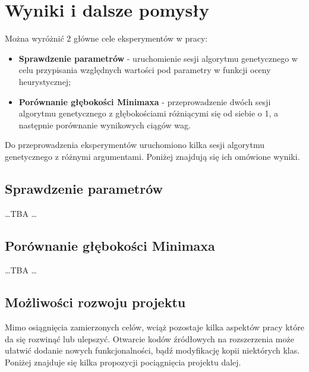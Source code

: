 \chapter{Wyniki i dalsze pomysły}
\thispagestyle{chapterBeginStyle}


Można wyróżnić 2 główne cele eksperymentów w pracy: 
\begin{itemize}
\item \textbf{Sprawdzenie parametrów} - uruchomienie sesji algorytmu genetycznego w celu przypisania względnych wartości pod parametry w funkcji oceny heurystycznej;
\item \textbf{Porównanie głębokości Minimaxa} - przeprowadzenie dwóch sesji algorytmu genetycznego z głębokościami różniącymi się od siebie o 1, a następnie porównanie wynikowych ciągów wag.
\end{itemize}

Do przeprowadzenia eksperymentów uruchomiono kilka sesji algorytmu genetycznego z różnymi argumentami. Poniżej znajdują się ich omówione wyniki.

\section{Sprawdzenie parametrów}

\ldots TBA \ldots

\section{Porównanie głębokości Minimaxa}

\ldots TBA \ldots

\section{Możliwości rozwoju projektu}

Mimo osiągnięcia zamierzonych celów, wciąż pozostaje kilka aspektów pracy które da się rozwinąć lub ulepszyć. Otwarcie kodów źródłowych na rozszerzenia może ułatwić dodanie nowych funkcjonalności, bądź modyfikację kopii niektórych klas. Poniżej znajduje się kilka propozycji pociągnięcia projektu dalej.

